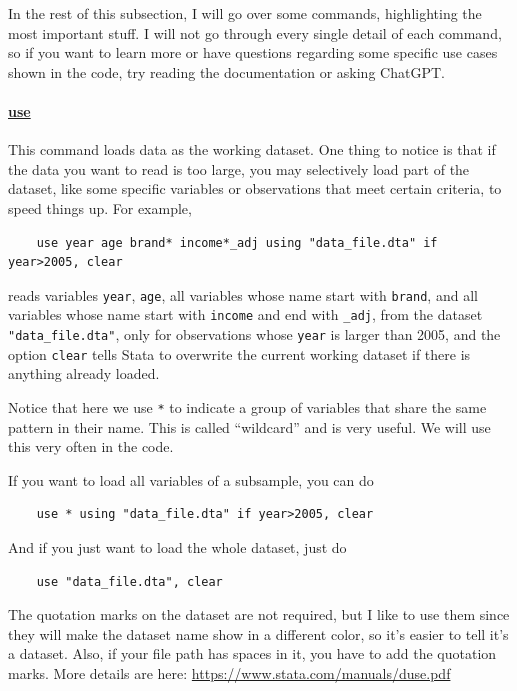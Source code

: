 In the rest of this subsection, I will go over some commands, highlighting the most important stuff. I will not go through every single detail of each command, so if you want to learn more or have questions regarding some specific use cases shown in the code, try reading the documentation or asking ChatGPT.

\paragraph{\underline{use}} This command loads data as the working dataset. One thing to notice is that if the data you want to read is too large, you may selectively load part of the dataset, like some specific variables or observations that meet certain criteria, to speed things up. For example, 
\begin{verbatim}
    use year age brand* income*_adj using "data_file.dta" if year>2005, clear 
\end{verbatim}
reads variables \verb|year|, \verb|age|, all variables whose name start with \verb|brand|, and all variables whose name start with \verb|income| and end with \verb|_adj|, from the dataset \verb|"data_file.dta"|, only for observations whose \verb|year| is larger than 2005, and the option \verb|clear| tells Stata to overwrite the current working dataset if there is anything already loaded. 

Notice that here we use \verb|*| to indicate a group of variables that share the same pattern in their name. This is called ``wildcard'' and is very useful. We will use this very often in the code. 

If you want to load all variables of a subsample, you can do 
\begin{verbatim}
    use * using "data_file.dta" if year>2005, clear 
\end{verbatim}
And if you just want to load the whole dataset, just do
\begin{verbatim}
    use "data_file.dta", clear
\end{verbatim}

The quotation marks on the dataset are not required, but I like to use them since they will make the dataset name show in a different color, so it's easier to tell it's a dataset. Also, if your file path has spaces in it, you have to add the quotation marks. More details are here: \url{https://www.stata.com/manuals/duse.pdf}


